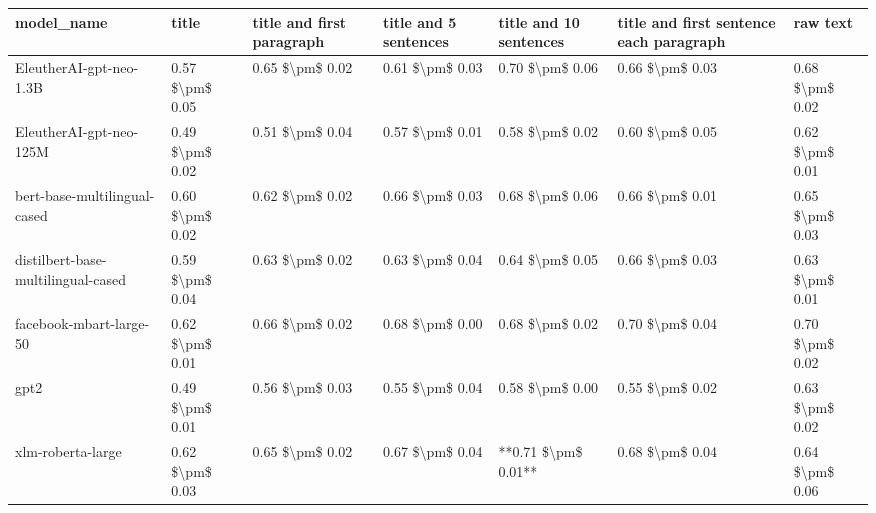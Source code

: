 \begin{tabular}{lllllll}
\toprule
                        model\_name &           title & title and first paragraph & title and 5 sentences & title and 10 sentences & title and first sentence each paragraph &        raw text \\
\midrule
           EleutherAI-gpt-neo-1.3B & 0.57 \$\textbackslash pm\$ 0.05 &           0.65 \$\textbackslash pm\$ 0.02 &       0.61 \$\textbackslash pm\$ 0.03 &        0.70 \$\textbackslash pm\$ 0.06 &                         0.66 \$\textbackslash pm\$ 0.03 & 0.68 \$\textbackslash pm\$ 0.02 \\
           EleutherAI-gpt-neo-125M & 0.49 \$\textbackslash pm\$ 0.02 &           0.51 \$\textbackslash pm\$ 0.04 &       0.57 \$\textbackslash pm\$ 0.01 &        0.58 \$\textbackslash pm\$ 0.02 &                         0.60 \$\textbackslash pm\$ 0.05 & 0.62 \$\textbackslash pm\$ 0.01 \\
      bert-base-multilingual-cased & 0.60 \$\textbackslash pm\$ 0.02 &           0.62 \$\textbackslash pm\$ 0.02 &       0.66 \$\textbackslash pm\$ 0.03 &        0.68 \$\textbackslash pm\$ 0.06 &                         0.66 \$\textbackslash pm\$ 0.01 & 0.65 \$\textbackslash pm\$ 0.03 \\
distilbert-base-multilingual-cased & 0.59 \$\textbackslash pm\$ 0.04 &           0.63 \$\textbackslash pm\$ 0.02 &       0.63 \$\textbackslash pm\$ 0.04 &        0.64 \$\textbackslash pm\$ 0.05 &                         0.66 \$\textbackslash pm\$ 0.03 & 0.63 \$\textbackslash pm\$ 0.01 \\
           facebook-mbart-large-50 & 0.62 \$\textbackslash pm\$ 0.01 &           0.66 \$\textbackslash pm\$ 0.02 &       0.68 \$\textbackslash pm\$ 0.00 &        0.68 \$\textbackslash pm\$ 0.02 &                         0.70 \$\textbackslash pm\$ 0.04 & 0.70 \$\textbackslash pm\$ 0.02 \\
                              gpt2 & 0.49 \$\textbackslash pm\$ 0.01 &           0.56 \$\textbackslash pm\$ 0.03 &       0.55 \$\textbackslash pm\$ 0.04 &        0.58 \$\textbackslash pm\$ 0.00 &                         0.55 \$\textbackslash pm\$ 0.02 & 0.63 \$\textbackslash pm\$ 0.02 \\
                 xlm-roberta-large & 0.62 \$\textbackslash pm\$ 0.03 &           0.65 \$\textbackslash pm\$ 0.02 &       0.67 \$\textbackslash pm\$ 0.04 &    **0.71 \$\textbackslash pm\$ 0.01** &                         0.68 \$\textbackslash pm\$ 0.04 & 0.64 \$\textbackslash pm\$ 0.06 \\
\bottomrule
\end{tabular}
